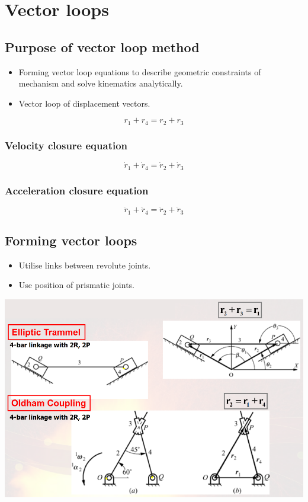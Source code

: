 \documentclass[11pt]{article}
\begin{document}
 \newpage
\section{Vector loops}
\label{sec:org575c4d5}

\subsection{Purpose of vector loop method}
\label{sec:orgaf56308}
\begin{itemize}
\item Forming vector loop equations to describe geometric constraints of mechanism and solve kinematics analytically.
\item Vector loop of displacement vectors.
\end{itemize}
\[r_1 + r_4 = r_2 + r_3\]
\subsubsection{Velocity closure equation}
\label{sec:org56775b8}
\[\dot{r}_1 + \dot{r}_4 = \dot{r}_2 + \dot{r}_3\]
\subsubsection{Acceleration closure equation}
\label{sec:orgc189cb0}
\[\ddot{r}_1 + \ddot{r}_4 = \ddot{r}_2 +\ddot{r}_3\]
\subsection{Forming vector loops}
\label{sec:orgb059436}
\begin{itemize}
\item Utilise links between revolute joints.
\item Use position of prismatic joints.
\end{itemize}

\begin{center}
\includegraphics[width=.9\linewidth]{./images/forming-vector-loops.png}
\end{center}
\end{document}
